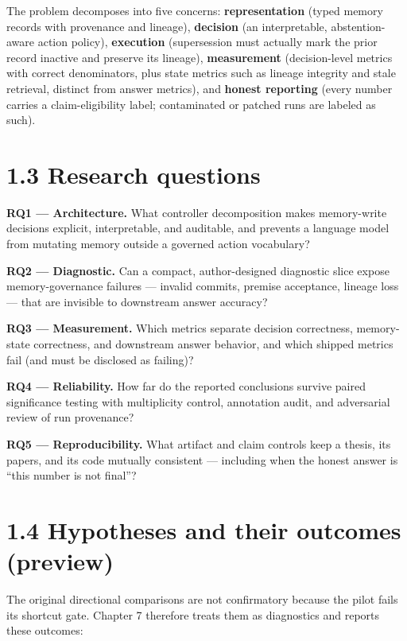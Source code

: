 The problem decomposes into five concerns: \textbf{representation}
(typed memory records with provenance and lineage), \textbf{decision}
(an interpretable, abstention-aware action policy), \textbf{execution}
(supersession must actually mark the prior record inactive and preserve
its lineage), \textbf{measurement} (decision-level metrics with correct
denominators, plus state metrics such as lineage integrity and stale
retrieval, distinct from answer metrics), and \textbf{honest reporting}
(every number carries a claim-eligibility label; contaminated or patched
runs are labeled as such).

\section{1.3 Research questions}\label{research-questions}

\textbf{RQ1 --- Architecture.} What controller decomposition makes
memory-write decisions explicit, interpretable, and auditable, and
prevents a language model from mutating memory outside a governed action
vocabulary?

\textbf{RQ2 --- Diagnostic.} Can a compact, author-designed diagnostic
slice expose memory-governance failures --- invalid commits, premise
acceptance, lineage loss --- that are invisible to downstream answer
accuracy?

\textbf{RQ3 --- Measurement.} Which metrics separate decision
correctness, memory-state correctness, and downstream answer behavior,
and which shipped metrics fail (and must be disclosed as failing)?

\textbf{RQ4 --- Reliability.} How far do the reported conclusions
survive paired significance testing with multiplicity control,
annotation audit, and adversarial review of run provenance?

\textbf{RQ5 --- Reproducibility.} What artifact and claim controls keep
a thesis, its papers, and its code mutually consistent --- including
when the honest answer is ``this number is not final''?

\section{1.4 Hypotheses and their outcomes
(preview)}\label{hypotheses-and-their-outcomes-preview}

The original directional comparisons are not confirmatory because the
pilot fails its shortcut gate. Chapter 7 therefore treats them as
diagnostics and reports these outcomes:


